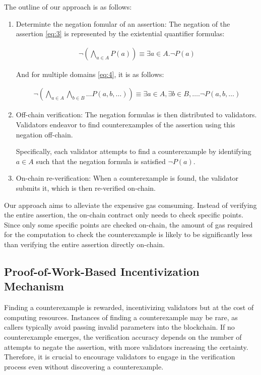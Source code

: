 \documentclass[runningheads]{llncs}
\begin{document}
The outline of our approach is as follows:
\begin{enumerate}
\item Determinte the negation fomular of an assertion: The negation of the assertion \ref{eq:3} is represented by the existential quantifier formulas:

\begin{gather}
\label{eq:5}
\neg \left( \bigwedge_{a \in A} P(a) \right) \equiv \exists a \in A. \neg P(a)
\end{gather}

And for multiple domains \ref{eq:4}, it is as follows:

\begin{gather}
\label{eq:6}
\neg \left( \bigwedge_{a \in A} \bigwedge_{b \in B} \dots P(a, b, \dots) \right) \equiv \exists a \in A, \exists b \in B, \dots . \neg P(a, b, \dots)
\end{gather}
\item Off-chain verification: The negation formulas is then distributed to validators. Validators endeavor to find counterexamples of the assertion using this negation off-chain. 

Specifically, each validator attempts to find a counterexample by identifying $a \in A$ such that the negation formula is satisfied $\neg P(a)$. 
\item On-chain re-verification: When a counterexample is found, the validator submits it, which is then re-verified on-chain. 
\end{enumerate}

Our approach aims to alleviate the expensive gas comsuming. Instead of verifying the entire assertion, the on-chain contract only needs to check specific points. Since only some specific points are checked on-chain, the amount of gas required for the computation to check the counterexample is likely to be significantly less than verifying the entire assertion directly on-chain.
\subsection{Proof-of-Work-Based Incentivization Mechanism}
Finding a counterexample is rewarded, incentivizing validators but at the cost of computing resources. Instances of finding a counterexample may be rare, as callers typically avoid passing invalid parameters into the blockchain. If no counterexample emerges, the verification accuracy depends on the number of attempts to negate the assertion, with more validators increasing the certainty. Therefore, it is crucial to encourage validators to engage in the verification process even without discovering a counterexample. %
\end{document}

